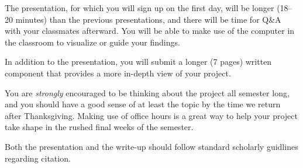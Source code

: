 \begin{description}
    The presentation, for which you will sign up on the first day, will be
    longer (18–20 minutes) than the previous presentations, and there will be
    time for Q\&A with your classmates afterward. You will be able to make use
    of the computer in the classroom to visualize or guide your findings.

    In addition to the presentation, you will submit a longer (7 pages) written
    component that provides a more in-depth view of your project.

    You are \textit{strongly} encouraged to be thinking about the project all
    semester long, and you should have a good sense of at least the topic by
    the time we return after Thanksgiving. Making use of office hours is a
    great way to help your project take shape in the rushed final weeks of the
    semester.

    Both the presentation and the write-up should follow standard scholarly
    guidlines regarding citation.

\end{description}
